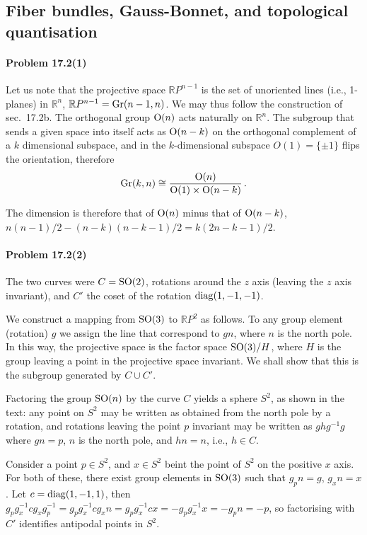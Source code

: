\documentclass[a4paper,12pt]{article}
\newcommand{\problem}[1]{\paragraph{Problem #1}}
\begin{document}
\subsection{Fiber bundles, Gauss-Bonnet, and topological quantisation}




\problem{17.2(1)} Let us note that the projective space $\mathbb{R}P^{n-1}$ is the set of unoriented lines (i.e., 1-planes) in $\mathbb{R}^n$, $\mathbb{R}P^{n-1} = {\rm Gr}(n-1, n)$. We may thus follow the construction of sec.\ 17.2b.  The orthogonal group ${\rm O}(n)$ acts naturally on $\mathbb{R}^n$. The subgroup that sends a given space into itself acts as ${\rm O}(n-k)$ on the orthogonal complement of a $k$ dimensional subspace, and in the $k$-dimensional subspace $O(1)=\{\pm 1\}$ flips the orientation, therefore
\[
 {\rm Gr}(k, n) \cong \frac{{\rm O}(n)}{{\rm O}(1)\times {\rm O}(n-k)}\,.
\]

The dimension is therefore that of ${\rm O}(n)$ minus that of ${\rm O}(n-k)$, $n(n-1)/2 - (n-k)(n-k-1)/2 = k(2n-k-1)/2$.


\problem{17.2(2)} The two curves were $C={\rm SO}(2)$, rotations around the $z$ axis (leaving the $z$ axis invariant), and $C'$ the coset of the rotation ${\rm diag}(1, -1, -1)$.

We construct a mapping from ${\rm SO}(3)$ to $\mathbb{R}P^2$ as follows. To any group element (rotation) $g$ we assign the line that correspond to $g n$, where $n$ is the north pole. In this way, the projective space is the factor space ${\rm SO}(3)/H$, where $H$ is the group leaving a point in the projective space invariant. We shall show that this is the subgroup generated by $C\cup C'$.

Factoring the group ${\rm SO}(n)$ by the curve $C$ yields a sphere $S^2$, as shown in the text: any point on $S^2$ may be written as obtained from the north pole by a rotation, and rotations leaving the point $p$ invariant may be written as $ghg^{-1} g$ where $gn =p$, $n$ is the north pole, and $hn=n$, i.e., $h\in C$.

Consider a point $p\in S^2$, and $x\in S^2$ beint the point of $S^2$ on the positive $x$ axis. For both of these, there exist group elements in ${\rm SO}(3)$ such that $g_p n = g$, $g_x n=x$. Let $c = {\rm diag}(1,-1,1)$, then $g_p g_x^{-1}cg_xg_p^{-1} = g_p g_x^{-1}c g_x n = g_p g_x^{-1} c x = -g_p g_x^{-1}x = -g_p n = -p$, so factorising with $C'$ identifies antipodal points in $S^2$.
\end{document}
